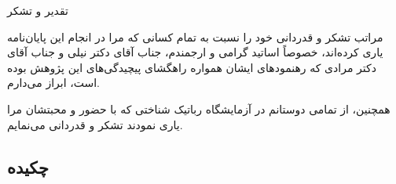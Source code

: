\documentclass[twoside, a4paper,11pt]{book}
\numberwithin{equation}{chapter}
\numberwithin{table}{chapter}
\numberwithin{figure}{chapter}
\numberwithin{equation}{chapter}
\begin{document}
\newpage
\thispagestyle{empty}
\mbox{}


\newpage
\thispagestyle{empty}
{\nastaliqbig \Huge 
تقدیر و تشکر\nastaliq

{\par\vspace{1cm}}
\LARGE
\begin{adjustwidth}{1cm}{}
مراتب تشکر و قدردانی خود را نسبت به تمام کسانی که مرا در انجام این پایان‌نامه یاری کرده‌اند، خصوصاً اساتید گرامی و ارجمندم، جناب آقای دکتر نیلی و جناب آقای دکتر مرادی که رهنمودهای ایشان همواره راهگشای پیچیدگی‌های این پژوهش بوده است، ابراز می‌دارم. 

همچنین، از تمامی دوستانم در آزمایشگاه رباتیک شناختی که با حضور و محبتشان مرا یاری نمودند تشکر و قدردانی می‌نمایم. 

\end{adjustwidth}
}


\newpage
\thispagestyle{empty}
\mbox{}


\pagestyle{plain}

\newpage


\vspace*{-2.6cm}
\subsection*{چکیده}

\vspace*{-.4cm}
\end{document}
